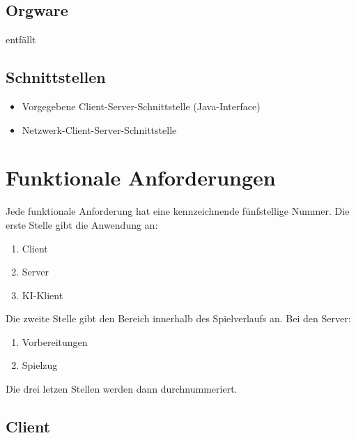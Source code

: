 \documentclass[a4paper,10pt]{article}
\begin{document}
\subsection{Orgware}
entfällt
\subsection{Schnittstellen}
\begin{itemize}
\item Vorgegebene Client-Server-Schnittstelle (Java-Interface)
\item Netzwerk-Client-Server-Schnittstelle
\end{itemize}
\section{Funktionale Anforderungen}
Jede funktionale Anforderung hat eine kennzeichnende fünfstellige Nummer. Die erste Stelle gibt die Anwendung an:
\begin{enumerate}
\item Client
\item Server
\item KI-Klient
\end{enumerate}
Die zweite Stelle gibt den Bereich innerhalb des Spielverlaufs an. Bei den Server:
\begin{enumerate}
\item Vorbereitungen
\item Spielzug
\end{enumerate}
Die drei letzen Stellen werden dann durchnummeriert.
\subsection{Client}
\end{document}
